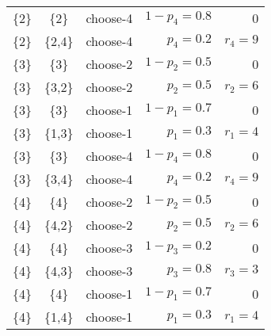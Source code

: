 \documentclass[english]{scrartcl}
\begin{document}
\begin{tabular}{ l | c | r | r | r }
  \{2\} & \{2\} & choose-4 & $1 - p_{4}=0.8$ & 0 \\
  \{2\} & \{2,4\} & choose-4 & $p_{4}=0.2$ & $r_{4}=9$ \\
  \{3\} & \{3\} & choose-2 & $1 - p_{2}=0.5$ & 0 \\
  \{3\} & \{3,2\} & choose-2 & $p_{2}=0.5$ & $r_{2}=6$ \\
  \{3\} & \{3\} & choose-1 & $1 - p_{1}=0.7$ & 0 \\
  \{3\} & \{1,3\} & choose-1 & $p_{1}=0.3$ & $r_{1}=4$ \\
  \{3\} & \{3\} & choose-4 & $1 - p_{4}=0.8$ & 0 \\
  \{3\} & \{3,4\} & choose-4 & $p_{4}=0.2$ & $r_{4}=9$ \\
  \{4\} & \{4\} & choose-2 & $1 - p_{2}=0.5$ & 0 \\
  \{4\} & \{4,2\} & choose-2 & $p_{2}=0.5$ & $r_{2}=6$ \\
  \{4\} & \{4\} & choose-3 & $1 - p_{3}=0.2$ & 0 \\
  \{4\} & \{4,3\} & choose-3 & $p_{3}=0.8$ & $r_{3}=3$ \\
  \{4\} & \{4\} & choose-1 & $1 - p_{1}=0.7$ & 0 \\
  \{4\} & \{1,4\} & choose-1 & $p_{1}=0.3$ & $r_{1}=4$ \\
    \end{tabular}
\end{document}
